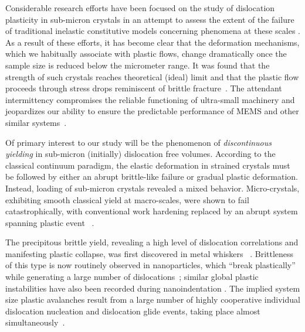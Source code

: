 \documentclass[CRPHYS,Unicode,manuscript]{cedram}
\begin{document}
Considerable research efforts have been focused on the study of dislocation plasticity in sub-micron crystals in an attempt to assess the extent of the failure of traditional inelastic constitutive models concerning phenomena at these scales  \cite{Mordehai2011-to,Maas2012-ib,Han2015-db,Papanikolaou2017-ld,Maas2018-qu}. As a result of these efforts, it has become clear that the deformation mechanisms, which we habitually associate with plastic flows, change dramatically once the sample size is reduced below the micrometer range. It was found that the strength of such crystals  reaches theoretical (ideal) limit  \cite{Nix1998-xr,Uchic2004-ax,Greer2005-ak,Dimiduk2006-fz} and  that the plastic flow  proceeds through stress drops reminiscent of brittle fracture~\cite{bei2008effects,chrobak2011deconfinement,wang2012pristine,Cui2017-xn}. The attendant intermittency compromises the reliable functioning of ultra-small machinery and jeopardizes our ability to ensure the predictable performance of MEMS and other similar systems~\cite{Csikor2007-ua,Benzerga2009-ny,Uchic2009-jl,Argon2013-fv,Zhang2017-cg}.

Of primary interest to our study will be the phenomenon of \emph{discontinuous yielding} in sub-micron (initially) dislocation free volumes. According to the classical continuum paradigm, the elastic deformation in strained crystals must be followed by either an abrupt brittle-like failure or gradual plastic deformation. Instead, loading of sub-micron crystals revealed a mixed behavior. Micro-crystals, exhibiting smooth classical yield at macro-scales, were shown to fail catastrophically, with conventional work hardening replaced by an abrupt system spanning plastic event ~\cite{Greer2011-av}. %

The precipitous brittle yield, revealing a high level of dislocation correlations and manifesting plastic collapse, was first discovered in metal whiskers ~\cite{Brenner1956-rx,Brenner1958-dr}. Brittleness of this type is now routinely observed in nanoparticles, which “break plastically” while generating a large number of dislocations~\cite{Sharma2018-iw,Mordehai2018-qm}; similar global plastic instabilities have also been recorded during nanoindentation  \cite{Lilleodden2006-jq, Corcoran1997-vt}. The implied system size plastic avalanches result from a large number of highly cooperative individual dislocation nucleation and dislocation glide events, taking place almost simultaneously~\cite{Dimiduk2006-fz,Csikor2007-ua,Maas2013-tq,Lee2020-nx}.
\end{document}
